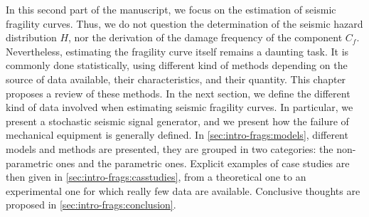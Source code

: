 In this second part of the manuscript, we focus on the estimation of seismic fragility curves. 
Thus, we do not question the determination of the seismic hazard distribution $H$, nor the derivation of the damage frequency of the component $C_f$.
Nevertheless, estimating the fragility curve itself %
remains a daunting task. It is commonly done statistically, using different kind of methods depending 
on the source of data available, their characteristics, and their quantity.
This chapter proposes a review of these methods. 
In the next section,
we define the different kind of data involved when estimating seismic fragility curves. In particular, we present a stochastic seismic signal generator, and  we present how the failure of mechanical equipment is generally defined.
In \cref{sec:intro-frags:models}, different models and methods are presented, they are grouped in two categories: the non-parametric ones and the parametric ones.
Explicit examples of case studies are then given in \cref{sec:intro-frags:casstudies}, from a theoretical one to an experimental one for which really few data are available.
Conclusive thoughts are proposed in \cref{sec:intro-frags:conclusion}.











%
%










